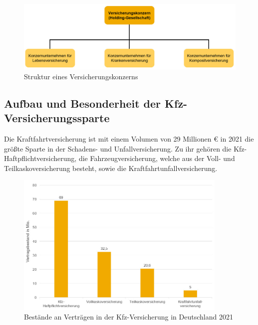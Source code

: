 \begin{figure}[h]
    \centering
    \includegraphics[width=1\textwidth]{img/Struktur_VKonzern2.jpg}
    \caption[Struktur eines Versicherungskonzerns]{Struktur eines Versicherungskonzerns\autocite{StVKonzern}}
    \label{fig:StVKonzern}
\end{figure}

\newpage

\subsection{Aufbau und Besonderheit der Kfz-Versicherungssparte}

Die Kraftfahrtversicherung ist mit einem Volumen von 29 Millionen € in 2021 die größte Sparte in der Schadens- und Unfallversicherung.\autocite[Vgl.][]{GDVSUV} Zu ihr gehören die Kfz-Haftpflichtversicherung, die Fahrzeugversicherung, welche aus der Voll- und Teilkaskoversicherung besteht, sowie die Kraftfahrtunfallversicherung.\autocite[Vgl.][S. 8]{MURINGER2000}

\begin{figure}[h]
    \centering
    \includegraphics[width=0.9\textwidth]{img/KfzV_Bestände_an_Verträgen_2021.jpg}
    \caption[Bestände an Verträgen in der Kfz-Versicherung in Deutschland 2021]{Bestände an Verträgen in der Kfz-Versicherung in Deutschland 2021\autocite{KfzVVBestand}}
    \label{fig:KfzVVBestand}
\end{figure}

